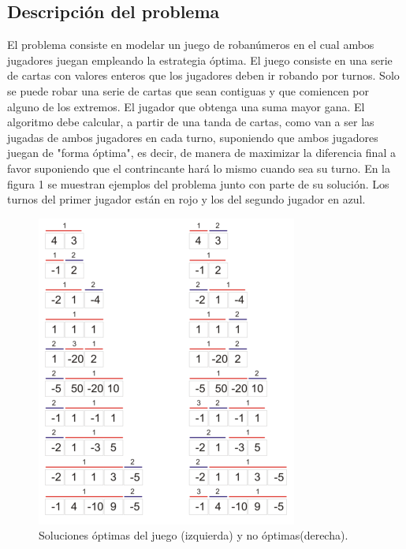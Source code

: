\subsection{Descripci\'on del problema}
El problema consiste en modelar un juego de roban\'umeros en el cual ambos jugadores juegan empleando la estrategia \'optima. El juego consiste en una serie de cartas con valores enteros que los jugadores deben ir robando por turnos. Solo se puede robar una serie de cartas que sean contiguas y que comiencen por alguno de los extremos. El jugador que obtenga una suma mayor gana.
El algoritmo debe calcular, a partir de una tanda de cartas, como van a ser las jugadas de ambos jugadores en cada turno, suponiendo que ambos jugadores juegan de "forma \'optima", es decir, de manera de maximizar la diferencia final a favor suponiendo que el contrincante har\'a lo mismo cuando sea su turno.
En la figura 1 se muestran ejemplos del problema junto con parte de su soluci\'on. Los turnos del primer jugador est\'an en rojo y los del segundo jugador en azul.

\begin{figure}[h]
\centering
\includegraphics{cartas.png}
\caption{Soluciones \'optimas del juego (izquierda) y no \'optimas(derecha).}
\end{figure}

